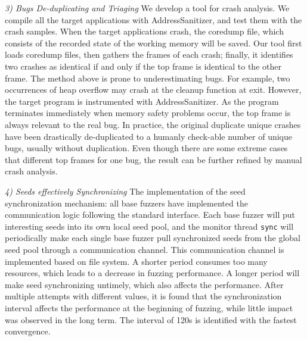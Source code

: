 \textit{3) Bugs De-duplicating and Triaging}
We develop a tool for crash analysis.
We compile all the target applications with AddressSanitizer, and test them with the crash samples. 
When the target applications crash, the coredump file, which consists of the recorded state of the working memory will be saved. %
Our tool first loads coredump files, then gathers the frames of each crash; finally, it identifies two crashes as identical if and only if the top frame is identical to the other frame. The method above is prone to underestimating bugs. For example, two occurrences of heap overflow may crash at the cleanup function at exit. However, the target program is instrumented with AddressSanitizer. As the program terminates immediately when memory safety problems occur, the top frame is always relevant to the real bug.
In practice, the original duplicate unique crashes have been drastically de-duplicated to a humanly check-able number of unique bugs, usually without duplication. Even though there are some extreme cases that different top frames for one bug, the result can be further refined by manual crash analysis. 


\textit{4) Seeds effectively Synchronizing}
The implementation of the seed synchronization mechanism: 
all base fuzzers have implemented the communication logic following the standard interface. Each base fuzzer will put interesting seeds into its own local seed pool, and the monitor thread \texttt{sync} will periodically make each single base fuzzer pull synchronized seeds from the global seed pool through a communication channel. This communication channel is implemented based on file system. 
A shorter period consumes too many resources, which leads to a decrease in fuzzing performance. 
A longer period will make seed synchronizing untimely, which also affects the performance.
After multiple attempts with different values, it is found that the synchronization interval affects the performance at the beginning of fuzzing, while little impact was observed in the long term. The interval of 120s is identified with the fastest convergence.

